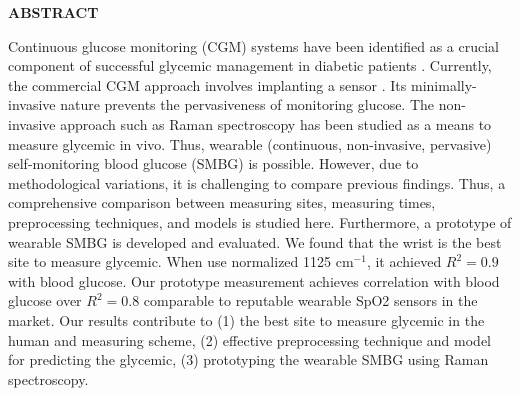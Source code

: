 {}

\begin{center}
    \large{\bf ABSTRACT}
\end{center}

\begin{sloppypar}
Continuous glucose monitoring (CGM) systems have been identified as a crucial component of successful glycemic management in diabetic patients \citep{continuous2021}.
Currently, the commercial CGM approach involves implanting a sensor \citep{CGMminimalinvasive}.
Its minimally-invasive nature prevents the pervasiveness of monitoring glucose.
The non-invasive approach such as Raman spectroscopy has been studied as a means to measure glycemic in vivo.
Thus, wearable (continuous, non-invasive, pervasive) self-monitoring blood glucose (SMBG) is possible.
However, due to methodological variations, it is challenging to compare previous findings.
Thus, a comprehensive comparison between measuring sites, measuring times, preprocessing techniques, and models is studied here.
Furthermore, a prototype of wearable SMBG is developed and evaluated.
We found that the wrist is the best site to measure glycemic. 
When use normalized 1125 $\text{cm}^{-1}$, it achieved $R^2 = 0.9$ with blood glucose.
Our prototype measurement achieves correlation with blood glucose over $R^2 = 0.8$ comparable to reputable wearable SpO2 sensors in the market. 
Our results contribute to (1) the best site to measure glycemic in the human and measuring scheme, 
(2) effective preprocessing technique and model for predicting the glycemic,
(3) prototyping the wearable SMBG using Raman spectroscopy.
\end{sloppypar}
